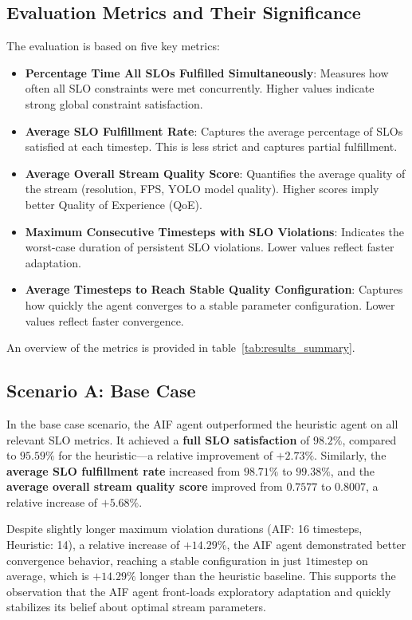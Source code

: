 \subsection{Evaluation Metrics and Their Significance}

The evaluation is based on five key metrics:

\begin{itemize}
  \item \textbf{Percentage Time All SLOs Fulfilled Simultaneously}: Measures how often all SLO constraints were met concurrently. Higher values indicate strong global constraint satisfaction.
  \item \textbf{Average SLO Fulfillment Rate}: Captures the average percentage of SLOs satisfied at each timestep. This is less strict and captures partial fulfillment.
  \item \textbf{Average Overall Stream Quality Score}: Quantifies the average quality of the stream (resolution, FPS, YOLO model quality). Higher scores imply better Quality of Experience (QoE).
  \item \textbf{Maximum Consecutive Timesteps with SLO Violations}: Indicates the worst-case duration of persistent SLO violations. Lower values reflect faster adaptation.
  \item \textbf{Average Timesteps to Reach Stable Quality Configuration}: Captures how quickly the agent converges to a stable parameter configuration. Lower values reflect faster convergence.
\end{itemize}

An overview of the metrics is provided in table~\ref{tab:results_summary}.




\subsection{Scenario A: Base Case}

In the base case scenario, the AIF agent outperformed the heuristic agent on all relevant SLO metrics. It achieved a \textbf{full SLO satisfaction} of \(98.2\%\), compared to \(95.59\%\) for the heuristic---a relative improvement of \(+2.73\%\). Similarly, the \textbf{average SLO fulfillment rate} increased from \(98.71\%\) to \(99.38\%\), and the \textbf{average overall stream quality score} improved from \(0.7577\) to \(0.8007\), a relative increase of \(+5.68\%\).

Despite slightly longer maximum violation durations (AIF: 16 timesteps, Heuristic: 14), a relative increase of \(+14.29\%\), the AIF agent demonstrated better convergence behavior, reaching a stable configuration in just \(1 \text{timestep}\) on average, which is \(+14.29\%\) longer than the heuristic baseline. This supports the observation that the AIF agent front-loads exploratory adaptation and quickly stabilizes its belief about optimal stream parameters.

